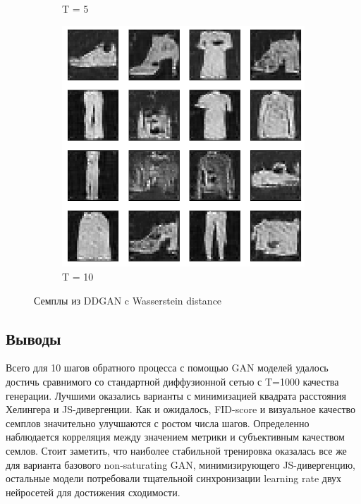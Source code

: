 \documentclass{article}
\begin{document}
\begin{figure}[H]
\begin{subfigure}[h]{0.3\linewidth}
		\caption{T = 5}
	\end{subfigure}
	\hfill
	\begin{subfigure}[h]{0.3\linewidth}
		\centering
		\includegraphics[scale=0.3]{../code/figures/generated_DDGAN_wd_10.png}
		\caption{T = 10}
	\end{subfigure}
	\caption{Семплы из DDGAN c Wasserstein distance}\label{ddgan_wd_samples}	
\end{figure}

\subsection{Выводы}
Всего для 10 шагов обратного процесса с помощью GAN моделей удалось достичь сравнимого со стандартной диффузионной сетью с T=1000 качества генерации. Лучшими оказались варианты с минимизацией квадрата расстояния Хелингера и JS-дивергенции. Как и ожидалось, FID-score и визуальное качество семплов значительно улучшаются с ростом числа шагов. Определенно наблюдается корреляция между значением метрики и субъективным качеством семлов. Стоит заметить, что наиболее стабильной тренировка оказалась все же для варианта базового non-saturating GAN, минимизирующего JS-дивергенцию, остальные модели потребовали тщательной синхронизации learning rate двух нейросетей для достижения сходимости.
\end{document}
